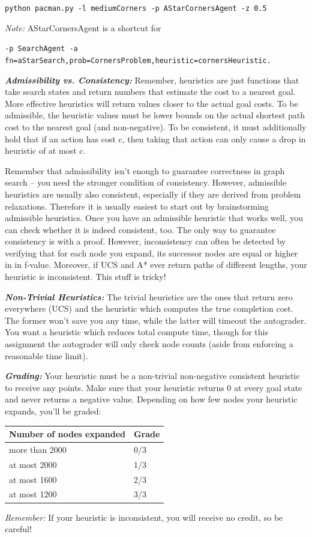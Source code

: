 \documentclass[a4paper, 11pt]{article}
\begin{document}
\texttt{python pacman.py -l mediumCorners -p AStarCornersAgent -z 0.5}

\textit{Note:} \textsf{AStarCornersAgent} is a shortcut for

\texttt{-p SearchAgent -a fn=aStarSearch,prob=CornersProblem,heuristic=cornersHeuristic.}

\textbf{\textit{Admissibility vs. Consistency:}} Remember, heuristics are just functions that take search states and return numbers that estimate the cost to a nearest goal. More effective heuristics will return values closer to the actual goal costs. To be admissible, the heuristic values must be lower bounds on the actual shortest path cost to the nearest goal (and non-negative). To be consistent, it must additionally hold that if an action has cost c, then taking that action can only cause a drop in heuristic of at most c.

Remember that admissibility isn't enough to guarantee correctness in graph search -- you need the stronger condition of consistency. However, admissible heuristics are usually also consistent, especially if they are derived from problem relaxations. Therefore it is usually easiest to start out by brainstorming admissible heuristics. Once you have an admissible heuristic that works well, you can check whether it is indeed consistent, too. The only way to guarantee consistency is with a proof. However, inconsistency can often be detected by verifying that for each node you expand, its successor nodes are equal or higher in in f-value. Moreover, if UCS and A* ever return paths of different lengths, your heuristic is inconsistent. This stuff is tricky!

\textbf{\textit{Non-Trivial Heuristics:}} The trivial heuristics are the ones that return zero everywhere (UCS) and the heuristic which computes the true completion cost. The former won't save you any time, while the latter will timeout the autograder. You want a heuristic which reduces total compute time, though for this assignment the autograder will only check node counts (aside from enforcing a reasonable time limit).

\textbf{\textit{Grading:}} Your heuristic must be a non-trivial non-negative consistent heuristic to receive any points. Make sure that your heuristic returns 0 at every goal state and never returns a negative value. Depending on how few nodes your heuristic expands, you'll be graded:

\begin{center}
\begin{tabular}{||l||l||}
  \hline\hline
  Number of nodes expanded & Grade\\
  \hline\hline
  more than 2000 & 0/3\\
  \hline\hline
  at most 2000 & 1/3\\
  \hline\hline
  at most 1600 & 2/3\\
  \hline\hline
  at most 1200 & 3/3\\
  \hline\hline
\end{tabular}
\end{center}
\textit{Remember:} If your heuristic is inconsistent, you will receive no credit, so be careful!
\end{document}
